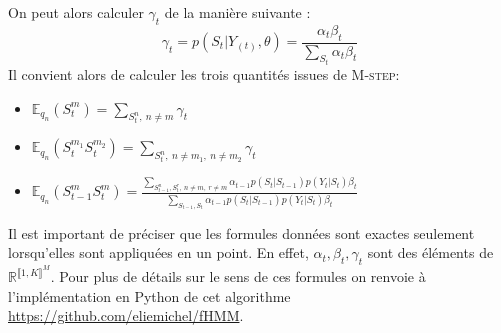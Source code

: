 \documentclass[10pt,a4paper]{article}
\newcommand{\Mstep}{\textsc{M-step}}
\begin{document}
On peut alors calculer $\gamma_t$ de la manière suivante :
\begin{equation}
\gamma_t=p(S_t \vert Y_{(t)}, \theta)= \frac{\alpha_t \beta_t}{\underset{S_t}{\sum} \alpha_t \beta_t}
\end{equation}
Il convient alors de calculer les trois quantités issues de \Mstep :
\begin{itemize}
\item $\mathbb{E}_{q_n}(S_t^m)= \underset{S_t^n, \ n \neq m}{\sum} \gamma_t$
\item $\mathbb{E}_{q_n}(S_t^{m_1}S_t^{m_2})= \underset{S_t^n, \ n \neq m_1, \ n \neq m_2}{\sum} \gamma_t$
\item $\mathbb{E}_{q_n}(S_{t-1}^mS_t^m)= \frac{\underset{S_{t-1}^n,S_t^r, \ n \neq m, \ r \neq m}{\sum}\alpha_{t-1} p(S_t \vert S_{t-1}) p(Y_t \vert S_t) \beta_t}{\underset{S_{t-1}, S_t}{\sum}\alpha_{t-1}p(S_t \vert S_{t-1})p(Y_t \vert S_t) \beta_t} $
\end{itemize}
Il est important de préciser que les formules données sont exactes seulement lorsqu'elles sont appliquées en un point. En effet, $\alpha_t, \beta_t, \gamma_t$ sont des éléments de $\mathbb{R}^{\llbracket 1,K \rrbracket^M}$. Pour plus de détails sur le sens de ces formules on renvoie à l'implémentation en Python de cet algorithme \href{url}{https://github.com/eliemichel/fHMM}.
\end{document}
